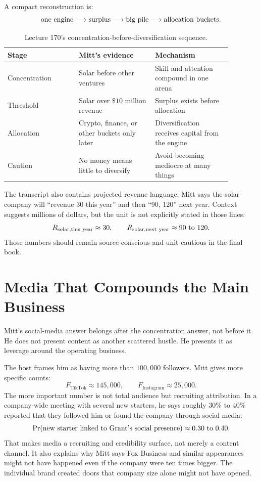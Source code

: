 \documentclass[11pt,oneside]{book}
\begin{document}
A compact reconstruction is:
\[
\hbox{one engine}
\longrightarrow
\hbox{surplus}
\longrightarrow
\hbox{big pile}
\longrightarrow
\hbox{allocation buckets}.
\]

\begin{table}
\centering
\small
\begin{tabular}{p{0.28\linewidth}p{0.30\linewidth}p{0.30\linewidth}}
\hline
Stage & Mitt's evidence & Mechanism \\
\hline
Concentration & Solar before other ventures & Skill and attention compound in one arena \\
Threshold & Solar over \(\$10\) million revenue & Surplus exists before allocation \\
Allocation & Crypto, finance, or other buckets only later & Diversification receives capital from the engine \\
Caution & No money means little to diversify & Avoid becoming mediocre at many things \\
\hline
\end{tabular}
\caption{Lecture 170's concentration-before-diversification sequence.}
\end{table}

The transcript also contains projected revenue language: Mitt says the solar company will ``revenue 30 this year'' and then ``90, 120'' next year. Context suggests millions of dollars, but the unit is not explicitly stated in those lines:
\[
R_{\mathrm{solar,this\ year}}\approx 30,
\qquad
R_{\mathrm{solar,next\ year}}\approx 90\hbox{ to }120.
\]
Those numbers should remain source-conscious and unit-cautious in the final book.

\section{Media That Compounds the Main Business}

Mitt's social-media answer belongs after the concentration answer, not before it. He does not present content as another scattered hustle. He presents it as leverage around the operating business.

The host frames him as having more than \(100{,}000\) followers. Mitt gives more specific counts:
\[
F_{\mathrm{TikTok}}\approx 145{,}000,
\qquad
F_{\mathrm{Instagram}}\approx 25{,}000.
\]
The more important number is not total audience but recruiting attribution. In a company-wide meeting with several new starters, he says roughly \(30\%\) to \(40\%\) reported that they followed him or found the company through social media:
\[
\Pr(\hbox{new starter linked to Grant's social presence})
\approx
0.30\hbox{ to }0.40.
\]
That makes media a recruiting and credibility surface, not merely a content channel. It also explains why Mitt says Fox Business and similar appearances might not have happened even if the company were ten times bigger. The individual brand created doors that company size alone might not have opened.
\end{document}
